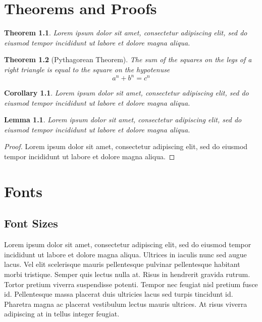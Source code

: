 \documentclass[a4paper, 12pt]{report}
\newtheorem{theorem}{Theorem}
\newtheorem{corollary}{Corollary}[theorem]
\newtheorem{lemma}{Lemma}[theorem]
\begin{document}



\chapter{Theorems and Proofs}
\begin{theorem}
	Lorem ipsum dolor sit amet, consectetur adipiscing elit, sed do eiusmod tempor incididunt ut labore et dolore magna aliqua.
\end{theorem}

\begin{theorem}[Pythagorean Theorem]
 The sum of the squares on the legs of a right triangle is equal to the square on the hypotenuse
 \[a^n + b^n = c^n\]
\end{theorem}

\begin{corollary}
	Lorem ipsum dolor sit amet, consectetur adipiscing elit, sed do eiusmod tempor incididunt ut labore et dolore magna aliqua.
\end{corollary}

\begin{lemma}
	Lorem ipsum dolor sit amet, consectetur adipiscing elit, sed do eiusmod tempor incididunt ut labore et dolore magna aliqua.
\end{lemma}

\begin{proof}
	Lorem ipsum dolor sit amet, consectetur adipiscing elit, sed do eiusmod tempor incididunt ut labore et dolore magna aliqua.
\end{proof}



\chapter{Fonts}
\section{Font Sizes}
Lorem ipsum {\tiny dolor sit amet}, consectetur adipiscing elit, {\huge sed do eiusmod} tempor incididunt ut labore et dolore magna aliqua. Ultrices in iaculis nunc sed augue lacus. Vel elit scelerisque mauris pellentesque pulvinar pellentesque habitant morbi tristique. Semper quis lectus nulla at. Risus in {\large hendrerit gravida rutrum}. Tortor pretium viverra suspendisse potenti. Tempor nec feugiat nisl {\LARGE pretium fusce id}. Pellentesque massa placerat duis ultricies lacus sed turpis tincidunt id. Pharetra magna ac placerat vestibulum lectus mauris ultrices. At risus viverra adipiscing at in tellus integer feugiat.
\end{document}
